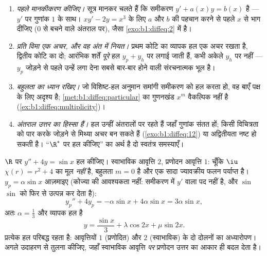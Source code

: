 \begin{remark}[सामान्य भूलें]\label{rem:b1:diffeq:pitfalls}
\begin{enumerate}
  \item \emph{पहले मानकीकरण कीजिए।} सूत्र मानकर चलते हैं कि समीकरण $y' +
  a(x)y = b(x)$ है --- $y'$ पर गुणांक $1$ के साथ। $xy' - 2y = x^3$ के लिए
  $a$ और $b$ की पहचान करने से पहले $x$ से भाग दीजिए ($0$ से बचने वाले अंतराल
  पर), जैसा \cref{exo:b1:diffeq:2} में है।
  \item \emph{प्रति विमा एक अचर, और वह अंत में नियत।} प्रथम कोटि का व्यापक
  हल एक अचर रखता है, द्वितीय कोटि का दो; आरंभिक शर्तें \emph{पूरे} हल $y_p +
  y_h$ पर लगाई जाती हैं, कभी अकेले $y_h$ पर नहीं --- $y_p$ जोड़ने से पहले
  उन्हें लगा देना सबसे बार-बार होने वाली संरचनात्मक भूल है।
  \item \emph{बहुलता का ध्यान रखिए।} जो विशिष्ट-हल अनुमान समांगी समीकरण को
  हल करता हो, वह बाएँ पक्ष के लिए अदृश्य है; \cref{met:b1:diffeq:particular}
  का गुणनखंड $x^m$ वैकल्पिक नहीं है (\cref{ex:b1:diffeq:multiplicity})।
  \item \emph{अंतराल उत्तर का हिस्सा हैं।} हल उन्हीं अंतरालों पर रहते हैं
  जहाँ गुणांक संतत हों; किसी विचित्रता को पार करके जोड़ने से मिथ्या अचर बन
  सकते हैं (\cref{exo:b1:diffeq:12}) या अद्वितीयता नष्ट हो सकती है। ``$\R^*$
  पर हल कीजिए'' का अर्थ है दो स्वतंत्र समस्याएँ।
\end{enumerate}
\end{remark}

\begin{example}[अनुनाद से हटकर प्रणोदन]\label{ex:b1:diffeq:offresonance}
$\R$ पर $y'' + 4y = \sin x$ हल कीजिए। स्वाभाविक आवृत्ति $2$, प्रणोदन आवृत्ति
$1$: चूँकि $\iu$ $\chi(r) = r^2 + 4$ का मूल \emph{नहीं} है, बहुलता $m = 0$
है और एक सादा ज्यावक्रीय फलन पर्याप्त है। $y_p = \alpha\sin x$ आज़माइए
(कोज्या की आवश्यकता नहीं: समीकरण में $y'$ वाला पद नहीं है, और $\sin$ $\sin$
को फिर से उत्पन्न कर देता है):
\[
y_p'' + 4y_p = -\alpha\sin x + 4\alpha\sin x = 3\alpha\sin x ,
\]
अतः $\alpha = \frac13$ और व्यापक हल है
\[
y = \frac{\sin x}3 + \lambda\cos 2x + \mu\sin 2x .
\]
प्रत्येक हल परिबद्ध रहता है: आवृत्तियों $1$ (प्रणोदित) और $2$ (स्वाभाविक) के
दो दोलनों का अध्यारोपण। अगले उदाहरण से तुलना कीजिए, जहाँ स्वाभाविक आवृत्ति
\emph{पर} प्रणोदन उत्तर का आकार ही बदल देता है।
\end{example}

